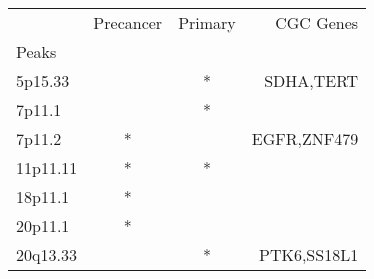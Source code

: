 \begin{tabular}{lccr}
\toprule
{} & Precancer & Primary &    CGC Genes \\
Peaks    &           &         &              \\
\midrule
5p15.33  &           &       * &    SDHA,TERT \\
7p11.1   &           &       * &              \\
7p11.2   &         * &         &  EGFR,ZNF479 \\
11p11.11 &         * &       * &              \\
18p11.1  &         * &         &              \\
20p11.1  &         * &         &              \\
20q13.33 &           &       * &  PTK6,SS18L1 \\
\bottomrule
\end{tabular}
